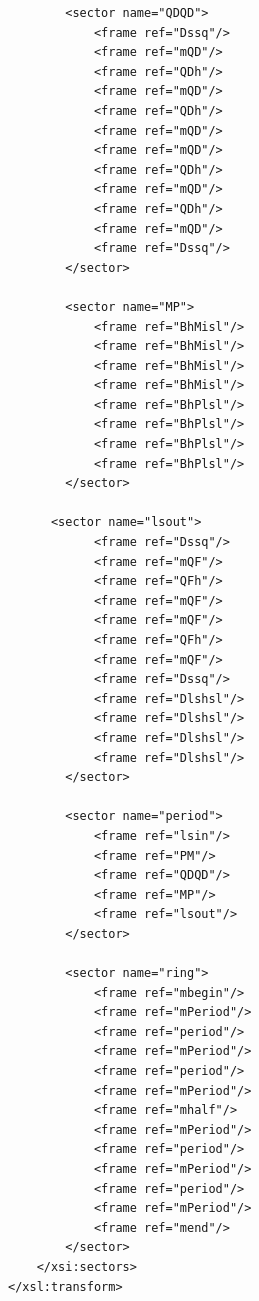 \documentclass[]{article}
\begin{document}
\begin{verbatim}
        <sector name="QDQD">
            <frame ref="Dssq"/>
            <frame ref="mQD"/>
            <frame ref="QDh"/>
            <frame ref="mQD"/>
            <frame ref="QDh"/>
            <frame ref="mQD"/>
            <frame ref="mQD"/>
            <frame ref="QDh"/>
            <frame ref="mQD"/>
            <frame ref="QDh"/>
            <frame ref="mQD"/>
            <frame ref="Dssq"/>
        </sector>

        <sector name="MP">
            <frame ref="BhMisl"/>
            <frame ref="BhMisl"/>
            <frame ref="BhMisl"/>
            <frame ref="BhMisl"/>
            <frame ref="BhPlsl"/>
            <frame ref="BhPlsl"/>
            <frame ref="BhPlsl"/>
            <frame ref="BhPlsl"/>
        </sector>
  
      <sector name="lsout">
            <frame ref="Dssq"/>
            <frame ref="mQF"/>
            <frame ref="QFh"/>
            <frame ref="mQF"/>
            <frame ref="mQF"/>
            <frame ref="QFh"/>
            <frame ref="mQF"/>
            <frame ref="Dssq"/>
            <frame ref="Dlshsl"/>
            <frame ref="Dlshsl"/>
            <frame ref="Dlshsl"/>
            <frame ref="Dlshsl"/>
        </sector>

        <sector name="period">
            <frame ref="lsin"/>
            <frame ref="PM"/>
            <frame ref="QDQD"/>
            <frame ref="MP"/>
            <frame ref="lsout"/>
        </sector>
        
        <sector name="ring">
            <frame ref="mbegin"/>
            <frame ref="mPeriod"/>
            <frame ref="period"/>
            <frame ref="mPeriod"/>
            <frame ref="period"/>
            <frame ref="mPeriod"/>
            <frame ref="mhalf"/>
            <frame ref="mPeriod"/>
            <frame ref="period"/>
            <frame ref="mPeriod"/>
            <frame ref="period"/>
            <frame ref="mPeriod"/>
            <frame ref="mend"/>
        </sector>
    </xsi:sectors>
</xsl:transform>
\end{verbatim}
\end{document}
